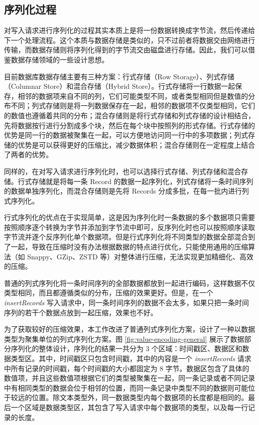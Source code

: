 \subsection{序列化过程}
对写入请求进行序列化的过程其实本质上是将一份数据转换成字节流，然后传递给下一个处理流程。这个本质与数据存储是类似的，只不过前者将数据交由网络进行传输，而数据存储则将序列化得到的字节流交由磁盘进行存储。因此，我们可以借鉴数据存储领域的一些设计思想。

目前数据库数据存储主要有三种方案：行式存储（Row Storage）、列式存储（Columnar Store）和混合存储（Hybrid Store）。行式存储将一行数据一起保存，相邻的数据项来自不同的列，它们可能类型不同，或者类型相同但是数值的分布不同；列式存储则是将一列数据保存在一起，相邻的数据项不仅类型相同，它们的数值也遵循着共同的分布；混合存储则是将行式存储和列式存储的设计相结合，先将数据按行进行分割成多个块，然后在每个块中按照列的形式存储。行式存储的优势是同一行的数据被聚集在一起，可以方便地访问同一行中的多项数据；列式存储的优势是可以获得更好的压缩比，减少数据体积；混合存储则在一定程度上结合了两者的优势。

同样的，在对写入请求进行序列化时，也可以选择行式存储、列式存储和混合存储。行式存储就是将每一条 Record 的数据一起序列化，列式存储将一条时间序列的数据单独序列化，而混合存储则是先将 Records 分成多批，在每一批内进行列式序列化。

行式序列化的优点在于实现简单，这是因为序列化时一条数据的多个数据项只需要按照顺序逐个转换为字节并添加到字节流中即可，反序列化时也可以按照顺序读取字节流并逐个反序列化单个数据项。但是行式序列化将不同类型的数据全部混合到了一起，导致在压缩时没有办法根据数据的特点进行优化，只能使用通用的压缩算法（如 Snappy\cite{samulowitz2013snappy}、GZip\cite{deutsch1996gzip}、ZSTD\cite{collet2018zstandard} 等）对整体进行压缩，无法实现更加精细化、高效的压缩。

普通的列式序列化将一条时间序列的全部数据都放到一起进行编码，这样数据不仅类型相同，而且都遵循类似的分布，压缩的效果更好。但是，在一个 \emph{insertRecords} 写入请求中，同一条时间序列的数据不会太多，如果只把一条时间序列的若干个数据点放到一起压缩，效果也不好。

为了获取较好的压缩效果，本工作改进了普通列式序列化方案，设计了一种以数据类型为聚集单位的列式序列化方案。图 \ref{fig:value-encoding-general} 展示了数据部分序列化的整体设计，序列化的结果一共分为 3 个区域：时间戳区、数据区和数据类型区。其中，时间戳区只包含时间戳，其中的内容是一个 \emph{insertRecords} 请求中所有记录的时间戳，每个时间戳的大小都固定为 8 字节。数据区包含了具体的数值项，并且这些数值项根据它们的类型被聚集在一起，同一条记录或者不同记录中有相同类型的数据会位于相邻的位置，而同一条记录中类型不同的数据则可能位于较远的位置。除文本类型外，同一数据类型内每个数据项的长度都是相同的。最后一个区域是数据类型区，其包含了写入请求中每个数据项的类型，以及每一行记录的长度。

